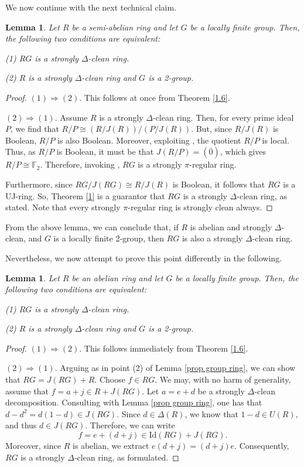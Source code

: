\documentclass[12pt]{amsart}
\newtheorem{lemma}[theorem]{Lemma}
\theoremstyle{definition}
\begin{document}
We now continue with the next technical claim.

\begin{lemma}
Let $R$ be a semi-abelian ring and let $G$ be a locally finite group. Then, the following two conditions are equivalent:

(1) $RG$ is a strongly $\Delta$-clean ring.

(2) $R$ is a strongly $\Delta$-clean ring and $G$ is a 2-group.
\end{lemma}

\begin{proof}
$(1) \Rightarrow (2)$. This follows at once from Theorem \ref{1.6}.

$(2) \Rightarrow (1)$. Assume $R$ is a strongly $\Delta$-clean ring. Then, for every prime ideal $P$, we find that $R/P \cong (R/J(R))/(P/J(R))$. But, since $R/J(R)$ is Boolean, $R/P$ is also Boolean. Moreover, exploiting \cite[Theorem 3.3]{wchen}, the quotient $R/P$ is local. Thus, as $R/P$ is Boolean, it must be that $J(R/P)=(\overline{0})$, which gives $R/P \cong \mathbb{F}_2$. Therefore, invoking \cite[Theorem 3.3]{chin}, $RG$ is a strongly $\pi$-regular ring.

Furthermore, since $RG/J(RG) \cong R/J(R)$ is Boolean, it follows that $RG$ is a UJ-ring. So, Theorem \ref{1} is a guarantor that $RG$ is a strongly $\Delta$-clean ring, as stated. Note that every strongly $\pi$-regular ring is strongly clean always.
\end{proof}

From the above lemma, we can conclude that, if $R$ is abelian and strongly $\Delta$-clean, and $G$ is a locally finite 2-group, then $RG$ is also a strongly $\Delta$-clean ring.

Nevertheless, we now attempt to prove this point differently in the following.

\begin{lemma}
Let $R$ be an abelian ring and let $G$ be a locally finite group. Then, the following two conditions are equivalent:

(1) $RG$ is a strongly $\Delta$-clean ring.

(2) $R$ is a strongly $\Delta$-clean ring and $G$ is a 2-group.
\end{lemma}

\begin{proof}
$(1) \Rightarrow (2)$. This follows immediately from Theorem \ref{1.6}.

$(2) \Rightarrow (1)$. Arguing as in point (2) of Lemma \ref{prop group ring}, we can show that $RG=J(RG)+R$. Choose $f \in RG$. We may, with no harm of generality, assume that $f=a+j \in R +J(RG)$. Let $a=e+d$ be a strongly $\Delta$-clean decomposition. Consulting with Lemma \ref{prop group ring}, one has that $d-d^2=d(1-d)\in J(RG)$. Since $d \in \Delta(R)$, we know that $1-d \in U(R)$, and thus $d \in J(RG)$. Therefore, we can write $$f=e+(d +j) \in \text{Id}(RG)+J(RG).$$ Moreover, since $R$ is abelian, we extract $e(d+j)=(d+j)e$. Consequently, $RG$ is a strongly $\Delta$-clean ring, as formulated.
\end{proof}
\end{document}
